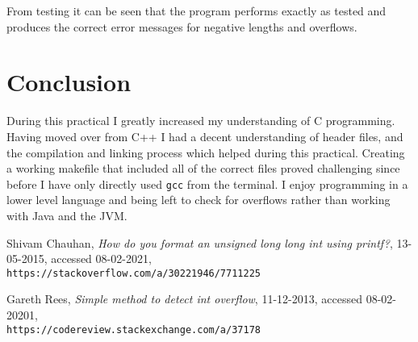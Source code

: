 \documentclass{article}
\begin{document}
\noindent From testing it can be seen that the program performs exactly as tested and produces the correct error messages for negative lengths and overflows.

\section{Conclusion}
During this practical I greatly increased my understanding of C programming. Having moved over from C++ I had a decent understanding of header files, and the compilation and linking process which helped during this practical. Creating a working makefile that included all of the correct files proved challenging since before I have only directly used \verb+gcc+ from the terminal. I enjoy programming in a lower level language and being left to check for overflows rather than working with Java and the JVM.


\begin{thebibliography}{10}
Shivam Chauhan, \textit{How do you format an unsigned long long int using printf?}, 13-05-2015, accessed 08-02-2021, \\\texttt{https://stackoverflow.com/a/30221946/7711225}

Gareth Rees, \textit{Simple method to detect int overflow}, 11-12-2013, accessed 08-02-20201, \\\texttt{https://codereview.stackexchange.com/a/37178}

\end{thebibliography}
\end{document}
